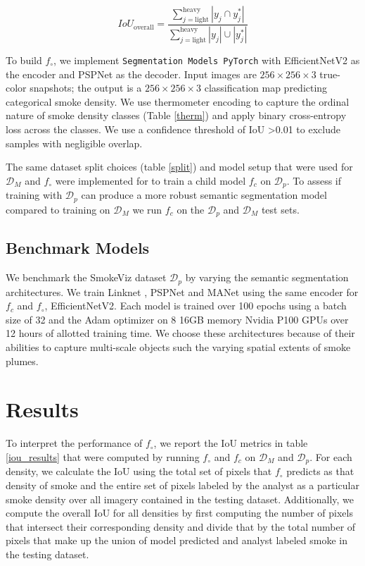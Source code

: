 \documentclass{article}
\begin{document}
\begin{equation} \label{overall_iou}
    IoU_{\text{overall}} = \frac{\sum\limits_{j=\text{light}}^{\text{heavy}}|y_{j}\cap y^*_{j}|}{\sum\limits_{j=\text{light}}^{\text{heavy}}|y_{j}|\cup|y^*_{j}|}
\end{equation}

To build \(f_{\circ}\), we implement \texttt{Segmentation Models PyTorch} \cite{semantic} with EfficientNetV2 \cite{efficientnetv2} as the encoder and PSPNet \cite{pspnet} as the decoder. Input images are \(256\times256\times3\) true-color snapshots; the output is a \(256\times256\times3\) classification map predicting categorical smoke density. We use thermometer encoding to capture the ordinal nature of smoke density classes (Table \ref{therm}) and apply binary cross-entropy loss across the classes. We use a confidence threshold of IoU  >0.01 \cite{conf_thresh} to exclude samples with negligible overlap. 

The same dataset split choices (table \ref{split}) and model setup that were used for \(\mathcal{D}_{M}\) and \(f_{\circ}\) were implemented for to train a child model \(f_c\) on \(\mathcal{D}_p\). To assess if training with \(\mathcal{D}_{p}\) can produce a more robust semantic segmentation model compared to training on \(\mathcal{D}_M\) we run \(f_c\) on the \(\mathcal{D}_{p}\) and \(\mathcal{D}_{M}\) test sets. 

\subsection{Benchmark Models}

We benchmark the SmokeViz dataset \(\mathcal{D}_{p}\) by varying the semantic segmentation architectures. We train Linknet \cite{linknet}, PSPNet \cite{pspnet} and MANet \cite{manet} using the same encoder for \(f_c\) and \(f_{\circ}\), EfficientNetV2. Each model is trained over 100 epochs using a batch size of 32 and the Adam optimizer on 8 16GB memory Nvidia P100 GPUs over 12 hours of allotted training time. We choose these architectures because of their abilities to capture multi-scale objects such the varying spatial extents of smoke plumes.

\section{Results}

To interpret the performance of \(f_{\circ}\), we report the IoU metrics in table \ref{iou_results} that were computed by running \(f_{\circ}\) and \(f_c\) on \(\mathcal{D}_M\) and \(\mathcal{D}_{p}\). For each density, we calculate the IoU using the total set of pixels that \(f_{\circ}\) predicts as that density of smoke and the entire set of pixels labeled by the analyst as a particular smoke density over all imagery contained in the testing dataset. Additionally, we compute the overall IoU for all densities by first computing the number of pixels that intersect their corresponding density and divide that by the total number of pixels that make up the union of model predicted and analyst labeled smoke in the testing dataset.
\end{document}
